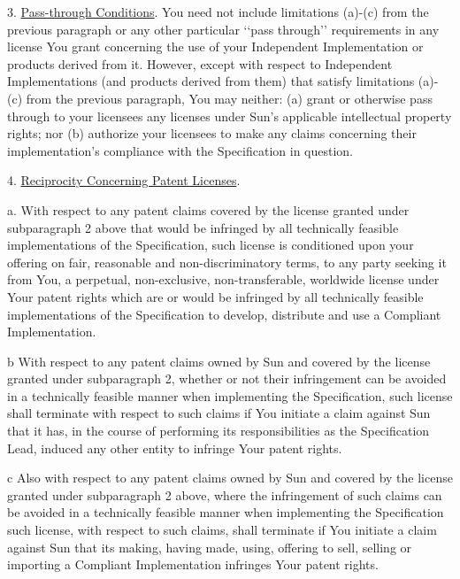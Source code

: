 3. \underline{Pass-through Conditions}. You need not include limitations (a)-(c)
from the previous paragraph or any other particular \lq\lq pass through\rq\rq
requirements in any license You grant concerning the use of your
Independent Implementation or products derived from it. However, except
with respect to Independent Implementations (and products derived from
them) that satisfy limitations (a)-(c) from the previous paragraph, You
may neither: (a) grant or otherwise pass through to your licensees any
licenses under Sun's applicable intellectual property rights; nor (b)
authorize your licensees to make any claims concerning their
implementation's compliance with the Specification in question.


4. \underline{Reciprocity Concerning Patent Licenses}.


a. With respect to any patent claims covered by the license granted
under subparagraph 2 above that would be infringed by all technically
feasible implementations of the Specification, such license is
conditioned upon your offering on fair, reasonable and
non-discriminatory terms, to any party seeking it from You, a perpetual,
non-exclusive, non-transferable, worldwide license under Your patent
rights which are or would be infringed by all technically feasible
implementations of the Specification to develop, distribute and use a
Compliant Implementation.


b With respect to any patent claims owned by Sun and covered by the
license granted under subparagraph 2, whether or not their infringement
can be avoided in a technically feasible manner when implementing the
Specification, such license shall terminate with respect to such claims
if You initiate a claim against Sun that it has, in the course of
performing its responsibilities as the Specification Lead, induced any
other entity to infringe Your patent rights.


c Also with respect to any patent claims owned by Sun and covered by the
license granted under subparagraph 2 above, where the infringement of
such claims can be avoided in a technically feasible manner when
implementing the Specification such license, with respect to such
claims, shall terminate if You initiate a claim against Sun that its
making, having made, using, offering to sell, selling or importing a
Compliant Implementation infringes Your patent rights.


